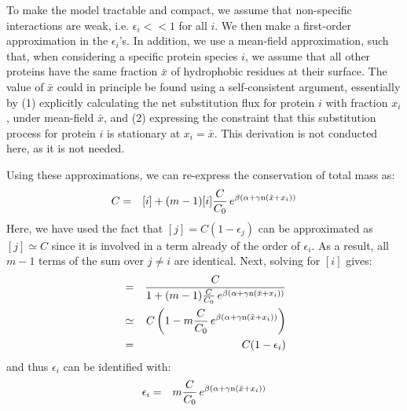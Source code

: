 \documentclass{article}
\begin{document}
To make the model tractable and compact, we assume that non-specific interactions are weak, i.e. $\epsilon_i << 1$ for all $i$. We then make a first-order approximation in the $\epsilon_i$'s. In addition, we use a mean-field approximation, such that, when considering a specific protein species $i$, we assume that all other proteins have the same fraction $\bar x$ of hydrophobic residues at their surface. The value of $\bar x$ could in principle be found using a self-consistent argument, essentially by (1) explicitly calculating the net substitution flux for protein $i$ with fraction $x_i$, under mean-field $\bar x$, and (2) expressing the constraint that this substitution process for protein $i$ is stationary at $x_i = \bar x$. This derivation is not conducted here, as it is not needed.

Using these approximations, we can re-express the conservation of total mass as:
\begin{eqnarray}
C &=& [i] + (m-1) [i] \frac{C}{C_0} \, e^{\beta (\alpha + \gamma \text{n} (\bar x + x_i))}
\end{eqnarray}
Here, we have used the fact that $[j] = C(1 - \epsilon_j)$ can be approximated as $[j] \simeq C$ since it is involved in a term already of the order of $\epsilon_i$. As a result, all $m-1$ terms of the sum over $j\neq i$ are identical.
Next, solving for $[i]$ gives:
\begin{eqnarray}
[i] &=& \frac{C} {1 + (m-1) \frac{C}{C_0} \, e^{\beta (\alpha + \gamma \Nsite (\bar x + x_i))}}
\\ &\simeq& C \left( 1 - m \frac{C}{C_0} \, e^{\beta (\alpha + \gamma \Nsite (\bar x + x_i))} \right)
\\ &=&
C (1 - \epsilon_i)
\end{eqnarray}
and thus $\epsilon_i$ can be identified with:
\begin{eqnarray}
\epsilon_i  &=& m \frac{C}{C_0} \, e^{\beta (\alpha +\gamma \text{n} (\bar x + x_i))}
\end{eqnarray}
\end{document}
